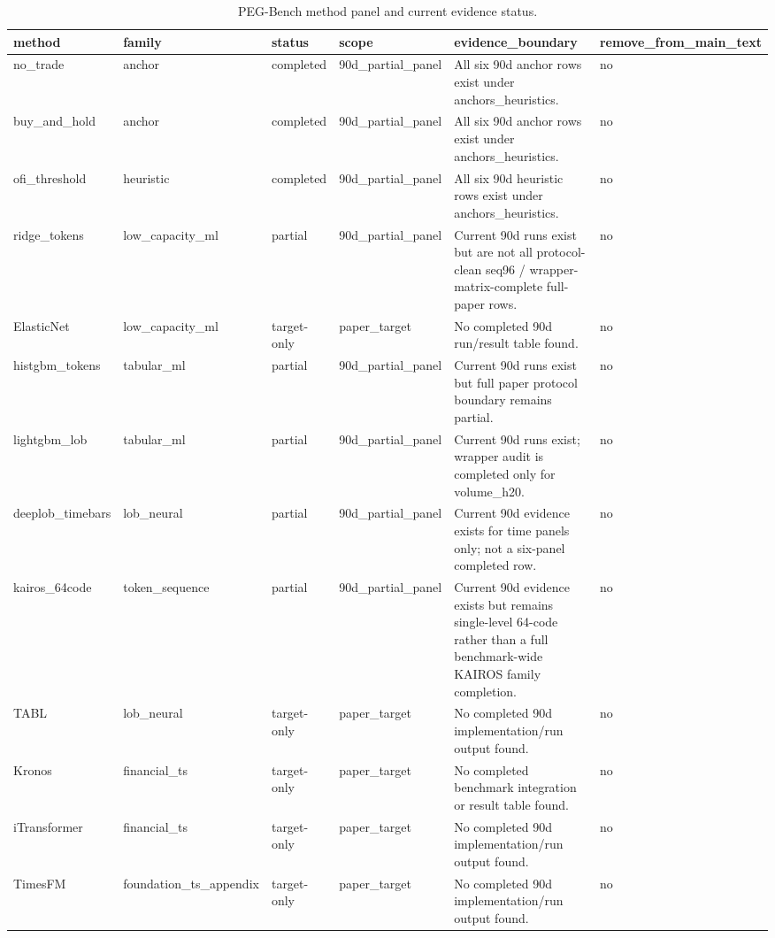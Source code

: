 \begin{table}[t]
\centering
\caption{PEG-Bench method panel and current evidence status.}
\label{tab:table_13_method_panel_status}
\begin{tabular}{llllll}
\toprule
method & family & status & scope & evidence\_boundary & remove\_from\_main\_text \\
\midrule
no\_trade & anchor & completed & 90d\_partial\_panel & All six 90d anchor rows exist under anchors\_heuristics. & no \\
buy\_and\_hold & anchor & completed & 90d\_partial\_panel & All six 90d anchor rows exist under anchors\_heuristics. & no \\
ofi\_threshold & heuristic & completed & 90d\_partial\_panel & All six 90d heuristic rows exist under anchors\_heuristics. & no \\
ridge\_tokens & low\_capacity\_ml & partial & 90d\_partial\_panel & Current 90d runs exist but are not all protocol-clean seq96 / wrapper-matrix-complete full-paper rows. & no \\
ElasticNet & low\_capacity\_ml & target-only & paper\_target & No completed 90d run/result table found. & no \\
histgbm\_tokens & tabular\_ml & partial & 90d\_partial\_panel & Current 90d runs exist but full paper protocol boundary remains partial. & no \\
lightgbm\_lob & tabular\_ml & partial & 90d\_partial\_panel & Current 90d runs exist; wrapper audit is completed only for volume\_h20. & no \\
deeplob\_timebars & lob\_neural & partial & 90d\_partial\_panel & Current 90d evidence exists for time panels only; not a six-panel completed row. & no \\
kairos\_64code & token\_sequence & partial & 90d\_partial\_panel & Current 90d evidence exists but remains single-level 64-code rather than a full benchmark-wide KAIROS family completion. & no \\
TABL & lob\_neural & target-only & paper\_target & No completed 90d implementation/run output found. & no \\
Kronos & financial\_ts & target-only & paper\_target & No completed benchmark integration or result table found. & no \\
iTransformer & financial\_ts & target-only & paper\_target & No completed 90d implementation/run output found. & no \\
TimesFM & foundation\_ts\_appendix & target-only & paper\_target & No completed 90d implementation/run output found. & no \\

\end{tabular}
\end{table}
